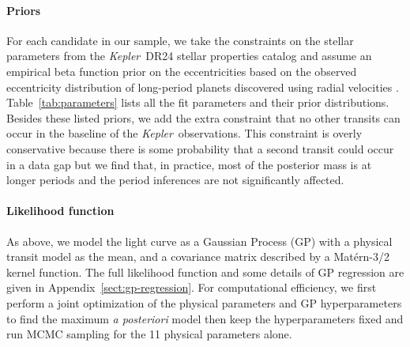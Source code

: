 \documentclass[manuscript, letterpaper]{aastex6}
\newcommand{\project}[1]{\textsl{#1}}
\newcommand{\kepler}{\project{Kepler}}
\newcommand{\foreign}[1]{\emph{#1}}
\newcommand{\sectref}[1]{\ref{sect:#1}}
\newcommand{\App}[1]{Appendix~\sectref{#1}}
\newcommand{\app}[1]{\App{#1}}
\begin{document}
\paragraph{Priors}

For each candidate in our sample, we take the constraints on the stellar
parameters from the \kepler\ DR24 stellar properties catalog and assume an
empirical beta function prior on the eccentricities based on the observed
eccentricity distribution of long-period planets discovered using radial
velocities \citep{Kipping:2013}.
Table~\ref{tab:parameters} lists all the fit parameters and their prior
distributions.
Besides these listed priors, we add the extra constraint that no other
transits can occur in the baseline of the \kepler\ observations.
This constraint is overly conservative because there is some probability that
a second transit could occur in a data gap but we find that, in practice, most
of the posterior mass is at longer periods and the period inferences are not
significantly affected.

\paragraph{Likelihood function}

As above, we model the light curve as a Gaussian Process (GP) with a physical
transit model as the mean, and a covariance matrix described by a Mat\'ern-3/2
kernel function.
The full likelihood function and some details of GP regression are given in
\app{gp-regression}.
For computational efficiency, we first perform a joint optimization of the
physical parameters and GP hyperparameters to find the maximum \foreign{a
posteriori} model then keep the hyperparameters fixed and run MCMC sampling
for the 11 physical parameters alone.
\end{document}
